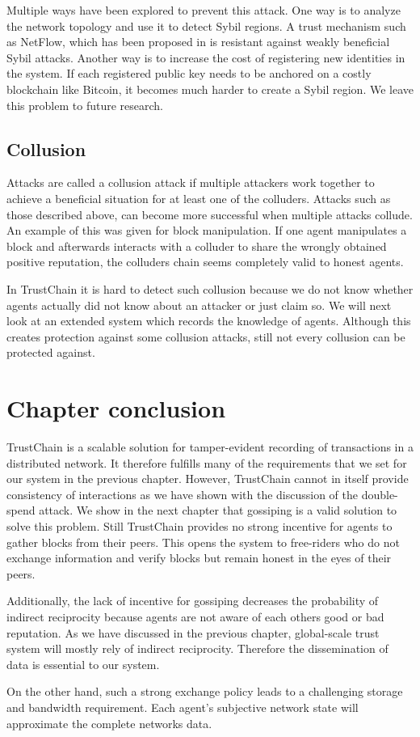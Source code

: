 Multiple ways have been explored to prevent this attack. One way is to analyze the network topology
and use it to detect Sybil regions. A trust mechanism such as NetFlow, which has been proposed in 
\cite{OTTE2017} is resistant against weakly beneficial Sybil attacks. Another way is to increase the cost of 
registering new identities in the system. If each registered public key needs to be anchored on a 
costly blockchain like Bitcoin, it becomes much harder to create a Sybil region. We leave this problem
to future research.

\subsection{Collusion}
\label{sec:collusion}
Attacks are called a collusion attack if multiple attackers work together to achieve a beneficial
situation for at least one of the colluders. Attacks such as those described above, 
can become more successful when multiple attacks collude. An example of this was given for block 
manipulation. If one agent manipulates a block and afterwards interacts with a colluder to share the
wrongly obtained positive reputation, the colluders chain seems completely valid to honest agents.

In TrustChain it is hard to detect such collusion because we do not know whether agents actually 
did not know about an attacker or just claim so. We will next look at an extended system which 
records the knowledge of agents. Although this creates protection against some collusion attacks, 
still not every collusion can be protected against.

\section{Chapter conclusion}
TrustChain is a scalable solution for tamper-evident recording of transactions in a distributed 
network. It therefore fulfills many of the requirements that we set for our system in the previous
chapter. However, TrustChain cannot in itself provide consistency of interactions as we have shown
with the discussion of the double-spend attack. We show in the next chapter that gossiping is a
valid solution to solve this problem. Still TrustChain provides no strong incentive for agents to 
gather blocks from their peers. This opens the system to free-riders who do not exchange information and verify 
blocks but remain honest in the eyes of their peers. 

Additionally, the lack of incentive for gossiping decreases the probability of indirect reciprocity
because agents are not aware of each others good or bad reputation.
As we have discussed in the previous chapter, global-scale trust system will mostly rely of indirect
reciprocity. Therefore the dissemination of data is essential to our system.

On the other hand, such a strong exchange policy leads to a challenging storage and bandwidth 
requirement. Each agent's subjective network state will approximate the complete networks data.